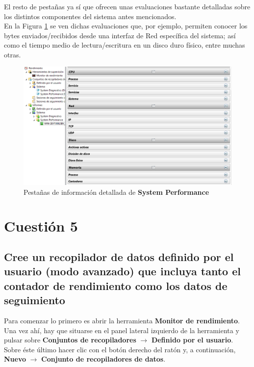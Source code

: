 El resto de pestañas ya sí que ofrecen unas evaluaciones bastante detalladas sobre los distintos componentes del sistema antes mencionados.
\\

En la Figura \ref{fig:figura8} se ven dichas evaluaciones que, por ejemplo, permiten conocer los bytes enviados/recibidos desde una interfaz de Red específica del sistema; así como el tiempo medio de lectura/escritura en un disco duro físico, entre muchas otras.

\begin{figure}[H] %
	\centering
	\includegraphics[scale=0.55]{figuras/figura8.png} 
	\caption{Pestañas de información detallada de \textbf{System Performance}} 
	\label{fig:figura8}
\end{figure}

\newpage




\section{Cuestión 5}
\subsection{Cree un recopilador de datos definido por el usuario (modo
	avanzado) que incluya tanto el contador de rendimiento como los datos de
	seguimiento}

	Para comenzar lo primero es abrir la herramienta \textbf{Monitor de rendimiento}. Una vez ahí, hay que situarse en el panel lateral izquierdo de la herramienta y pulsar sobre \textbf{Conjuntos de recopiladores} $ \rightarrow $ \textbf{Definido por el usuario}.
	Sobre éste último hacer clic con el botón derecho del ratón y, a continuación, \textbf{Nuevo} $ \rightarrow $ \textbf{Conjunto de recopiladores de datos}.
	\\
	
